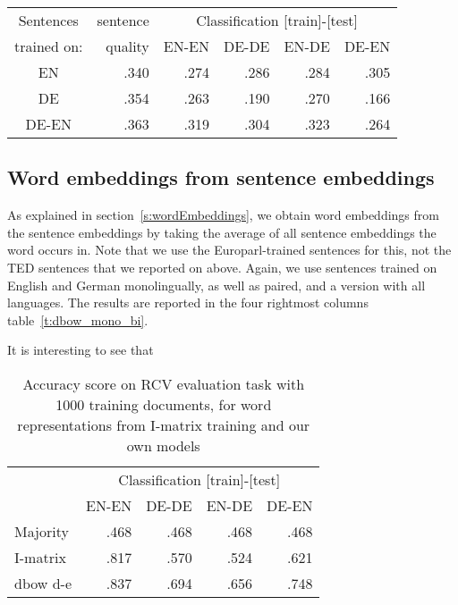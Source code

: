 \begin{table*}[t]
\center
\begin{tabular}{c | r|r r r r }
Sentences 		&sentence	&	\multicolumn{4}{c}{Classification [train]-[test]}	\\
trained on: 		&quality	&EN-EN	&DE-DE	&EN-DE	&DE-EN	\\\hline
EN			&.340		&.274		&.286		&.284		&.305\\
DE			&.354		&.263		&.190		&.270		&.166\\
DE-EN			&.363		&.319		&.304		&.323		&.264\\
\end{tabular}
\caption{F1 scores on TED classification task for sentence representations and word representations.}
\label{t:dbow_mono_bi}
\end{table*}



\subsection{Word embeddings from sentence embeddings}

As explained in section~\ref{s:wordEmbeddings}, we obtain word embeddings from the sentence embeddings by taking the average of all sentence embeddings the word occurs in. Note that we use the Europarl-trained sentences for this, not the TED sentences that we reported on above. Again, we use sentences trained on English and German monolingually, as well as paired, and a version with all languages. The results are reported in the four rightmost columns table~\ref{t:dbow_mono_bi}.

It is interesting to see that %





\begin{table}\center
\setlength\tabcolsep{2pt}
\begin{tabular}{l | r r r r}
		& \multicolumn{4}{c}{Classification [train]-[test]}	\\
		&EN-EN	&DE-DE	&EN-DE	&DE-EN	\\\hline
Majority	&.468		&.468		&.468		&.468		\\
I-matrix	&.817		&.570		&.524		&.621		\\
dbow d-e 	&.837		&.694		&.656		&.748		\\
\end{tabular}
\caption{Accuracy score on RCV evaluation task with 1000 training documents, for word representations from I-matrix training and our own models}
\label{t:dbow_bi_klemen}
\end{table}


